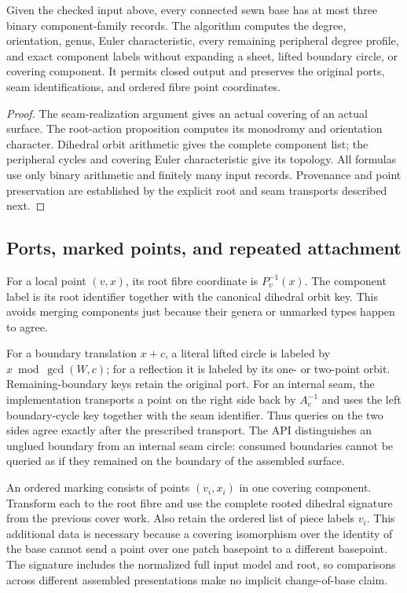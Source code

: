 \begin{theorem}
Given the checked input above, every connected sewn base has at most three
binary component-family records.  The algorithm computes the degree,
orientation, genus, Euler characteristic, every remaining peripheral
degree profile, and exact component labels without expanding a sheet,
lifted boundary circle, or covering component.  It permits closed output
and preserves the original ports, seam identifications, and ordered fibre
point coordinates.
\end{theorem}
\begin{proof}
The seam-realization argument gives an actual covering of an actual
surface.  The root-action proposition computes its monodromy and orientation
character.  Dihedral orbit arithmetic gives the complete component list;
the peripheral cycles and covering Euler characteristic give its topology.
All formulas use only binary arithmetic and finitely many input records.
Provenance and point preservation are established by the explicit root and
seam transports described next.
\end{proof}

\subsection{Ports, marked points, and repeated attachment}

For a local point $(v,x)$, its root fibre coordinate is $P_v^{-1}(x)$.
The component label is its root identifier together with the canonical
dihedral orbit key.  This avoids merging components just because their
genera or unmarked types happen to agree.

For a boundary translation $x+c$, a literal lifted circle is labeled by
$x\bmod\gcd(W,c)$; for a reflection it is labeled by its one- or two-point
orbit.  Remaining-boundary keys retain the original port.  For an internal
seam, the implementation transports a point on the right side back by
$A_e^{-1}$ and uses the left boundary-cycle key together with the seam
identifier.  Thus queries on the two sides agree exactly after the
prescribed transport.  The API distinguishes an unglued boundary from an
internal seam circle: consumed boundaries cannot be queried as if they
remained on the boundary of the assembled surface.

An ordered marking consists of points $(v_i,x_i)$ in one covering component.
Transform each to the root fibre and use the complete rooted dihedral
signature from the previous cover work.  Also retain the ordered list of
piece labels $v_i$.  This additional data is necessary because a covering
isomorphism over the identity of the base cannot send a point over one
patch basepoint to a different basepoint.  The signature includes the
normalized full input model and root, so comparisons across different
assembled presentations make no implicit change-of-base claim.

